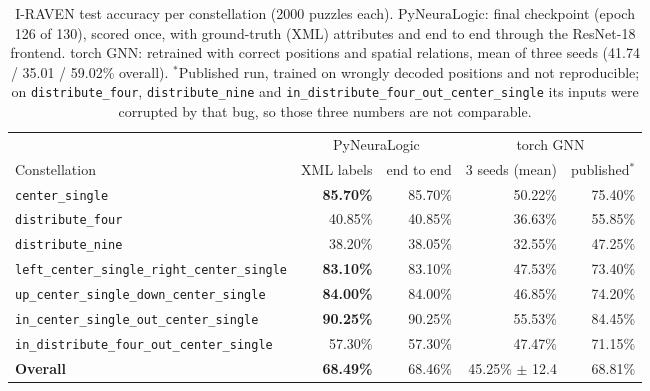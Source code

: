 \begin{table}[h]
\centering
\begin{tabular}{|l|r|r|r|r|}
\hline
 & \multicolumn{2}{c|}{PyNeuraLogic} & \multicolumn{2}{c|}{torch GNN} \\
Constellation & XML labels & end to end & 3 seeds (mean) & published$^{*}$ \\
\hline
\texttt{center\_single} & \textbf{85.70\%} & 85.70\% & 50.22\% & 75.40\% \\
\hline
\texttt{distribute\_four} & 40.85\% & 40.85\% & 36.63\% & 55.85\% \\
\hline
\texttt{distribute\_nine} & 38.20\% & 38.05\% & 32.55\% & 47.25\% \\
\hline
\texttt{left\_center\_single\_right\_center\_single} & \textbf{83.10\%} & 83.10\% & 47.53\% & 73.40\% \\
\hline
\texttt{up\_center\_single\_down\_center\_single} & \textbf{84.00\%} & 84.00\% & 46.85\% & 74.20\% \\
\hline
\texttt{in\_center\_single\_out\_center\_single} & \textbf{90.25\%} & 90.25\% & 55.53\% & 84.45\% \\
\hline
\texttt{in\_distribute\_four\_out\_center\_single} & 57.30\% & 57.30\% & 47.47\% & 71.15\% \\
\hline
\textbf{Overall} & \textbf{68.49\%} & 68.46\% & 45.25\% $\pm$ 12.4 & 68.81\% \\
\hline
\end{tabular}
\caption{I-RAVEN test accuracy per constellation (2000 puzzles each). PyNeuraLogic: final checkpoint
(epoch 126 of 130), scored once, with ground-truth (XML) attributes and end to end through the
ResNet-18 frontend. torch GNN: retrained with correct positions and spatial relations, mean of three
seeds (41.74 / 35.01 / 59.02\% overall). $^{*}$Published run, trained on wrongly decoded positions
and not reproducible; on \texttt{distribute\_four}, \texttt{distribute\_nine} and
\texttt{in\_distribute\_four\_out\_center\_single} its inputs were corrupted by that bug, so those
three numbers are not comparable.}
\label{tab:iraven-final-test}
\end{table}
